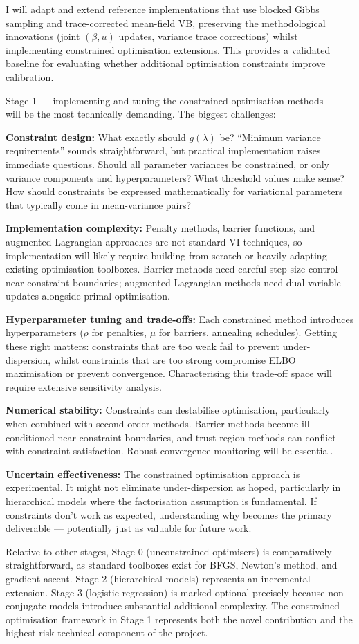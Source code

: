 \documentclass[11pt,a4paper]{article}
\begin{document}
I will adapt and extend reference implementations that use blocked Gibbs sampling and trace-corrected mean-field VB, preserving the methodological innovations (joint $(\beta, u)$ updates, variance trace corrections) whilst implementing constrained optimisation extensions. This provides a validated baseline for evaluating whether additional optimisation constraints improve calibration.

Stage 1 — implementing and tuning the constrained optimisation methods — will be the most technically demanding. The biggest challenges:

\textbf{Constraint design:} What exactly should $g(\lambda)$ be? ``Minimum variance requirements'' sounds straightforward, but practical implementation raises immediate questions. Should all parameter variances be constrained, or only variance components and hyperparameters? What threshold values make sense? How should constraints be expressed mathematically for variational parameters that typically come in mean-variance pairs?

\textbf{Implementation complexity:} Penalty methods, barrier functions, and augmented Lagrangian approaches are not standard VI techniques, so implementation will likely require building from scratch or heavily adapting existing optimisation toolboxes. Barrier methods need careful step-size control near constraint boundaries; augmented Lagrangian methods need dual variable updates alongside primal optimisation.

\textbf{Hyperparameter tuning and trade-offs:} Each constrained method introduces hyperparameters ($\rho$ for penalties, $\mu$ for barriers, annealing schedules). Getting these right matters: constraints that are too weak fail to prevent under-dispersion, whilst constraints that are too strong compromise ELBO maximisation or prevent convergence. Characterising this trade-off space will require extensive sensitivity analysis.

\textbf{Numerical stability:} Constraints can destabilise optimisation, particularly when combined with second-order methods. Barrier methods become ill-conditioned near constraint boundaries, and trust region methods can conflict with constraint satisfaction. Robust convergence monitoring will be essential.

\textbf{Uncertain effectiveness:} The constrained optimisation approach is experimental. It might not eliminate under-dispersion as hoped, particularly in hierarchical models where the factorisation assumption is fundamental. If constraints don't work as expected, understanding why becomes the primary deliverable — potentially just as valuable for future work.

Relative to other stages, Stage 0 (unconstrained optimisers) is comparatively straightforward, as standard toolboxes exist for BFGS, Newton's method, and gradient ascent. Stage 2 (hierarchical models) represents an incremental extension. Stage 3 (logistic regression) is marked optional precisely because non-conjugate models introduce substantial additional complexity. The constrained optimisation framework in Stage 1 represents both the novel contribution and the highest-risk technical component of the project.
\end{document}
